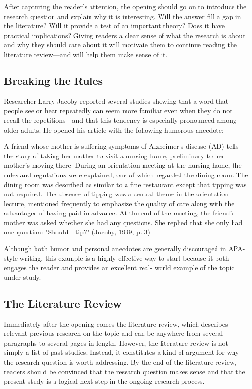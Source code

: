 After capturing the reader's attention, the opening should go on to introduce the research question and explain why it is interesting. Will the answer fill a gap in the literature? Will it provide a test of an important theory? Does it have practical implications? Giving readers a clear sense of what the research is about and why they should care about it will motivate them to continue reading the literature review---and will help them make sense of it.


\subsection{Breaking the Rules}

Researcher Larry Jacoby reported several studies showing that a word that people see or hear repeatedly can seem more familiar even when they do not recall the repetitions---and that this tendency is especially pronounced among older adults. He opened his article with the following humorous anecdote:

A friend whose mother is suffering symptoms of Alzheimer's disease (AD) tells the story of taking her mother to visit a nursing home, preliminary to her mother's moving there. During an orientation meeting at the nursing home, the rules and regulations were explained, one of which regarded the dining room. The dining room was described as similar to a fine restaurant except that tipping was not required. The absence of tipping was a central theme in the orientation lecture, mentioned frequently to emphasize the quality of care along with the advantages of having paid in advance. At the end of the meeting, the friend's mother was asked whether she had any questions. She replied that she only had one question: "Should I tip?" (Jacoby, 1999, p. 3)

Although both humor and personal anecdotes are generally discouraged in APA-style writing, this example is a highly effective way to start because it both engages the reader and provides an excellent real- world example of the topic under study.

\subsection{The Literature Review}

Immediately after the opening comes the literature review, which describes relevant previous research on the topic and can be anywhere from several paragraphs to several pages in length. However, the literature review is not simply a list of past studies. Instead, it constitutes a kind of argument for why the research question is worth addressing. By the end of the literature review, readers should be convinced that the research question makes sense and that the present study is a logical next step in the ongoing research process.

